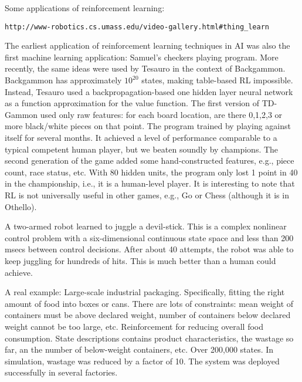 Some applications of reinforcement learning:

\begin{verbatim}
http://www-robotics.cs.umass.edu/video-gallery.html#thing_learn
\end{verbatim}

The earliest application of reinforcement learning techniques in AI
was also the first machine learning application: Samuel's checkers
playing program.  More recently, the same ideas were used by Tesauro
in the context of Backgammon.  Backgammon has approximately $10^{20}$
states, making table-based RL impossible.  Instead, Tesauro used a
backpropagation-based one hidden layer neural network as a
function approximation for the value function.  The first version of
TD-Gammon used only raw features: for each board location, are there 0,1,2,3
or more black/white pieces on that point.  The program trained by playing
against itself for several months.  It achieved a level of performance
comparable to a typical competent human player, but we beaten soundly by
champions.   The second generation of the game added some
hand-constructed features, e.g., piece count, race status, etc.
With 80 hidden units, the program only lost 1 point in 40 in the
championship, i.e., it is a human-level player.  It is interesting to note
that RL is not universally useful in other games, e.g., Go or Chess (although
it is in Othello).

A two-armed robot learned to juggle a devil-stick.  This is a complex
nonlinear control problem with a six-dimensional continuous state space and
less than 200 msecs between control decisions.  After about 40 attempts, the
robot was able to keep juggling for hundreds of hits.  This is much better
than a human could achieve.

A real example: Large-scale industrial packaging.
Specifically, fitting the right amount of food into boxes or cans.
There are lots of constraints: mean weight of containers must be above
declared weight, number of containers below declared weight cannot be
too large, etc.  Reinforcement for reducing overall food consumption.
State descriptions contains product characteristics, the wastage so far, an
the number of below-weight containers, etc.  Over 200,000 states.  In
simulation, wastage was reduced by a factor of 10.  The system was deployed
successfully in several factories. 

